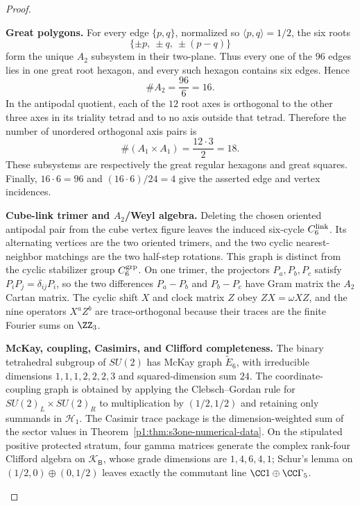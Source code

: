 \documentclass[11pt]{article}
\begin{document}
\begin{proof}
\begin{proofsteps}[label=\textbf{(\roman*)}]
\item \textbf{Great polygons.}
For every edge \(\{p,q\}\), normalized so
\(\langle p,q\rangle=1/2\), the six roots
\[
    \{\pm p,\ \pm q,\ \pm(p-q)\}
\]
form the unique \(A_2\) subsystem in their two-plane.  Thus every one of the
\(96\) edges lies in one great root hexagon, and every such hexagon contains
six edges.  Hence
\[
    \#A_2=\frac{96}{6}=16.
\]
In the antipodal quotient, each of the \(12\) root axes is orthogonal to the
other three axes in its triality tetrad and to no axis outside that tetrad.
Therefore the number of unordered orthogonal axis pairs is
\[
    \#(A_1\times A_1)=\frac{12\cdot3}{2}=18.
\]
These subsystems are respectively the great regular hexagons and great
squares.  Finally, \(16\cdot6=96\) and
\((16\cdot6)/24=4\) give the asserted edge and vertex incidences.

\item \textbf{Cube-link trimer and \(A_2\)/Weyl algebra.}
Deleting the chosen oriented antipodal pair from the cube vertex figure leaves
the induced six-cycle \(C_6^{\rm link}\).  Its alternating vertices are the
two oriented trimers, and the two cyclic nearest-neighbor matchings are the
two half-step rotations.  This graph is distinct from the cyclic stabilizer
group \(C_6^{\rm grp}\).  On one trimer, the projectors \(P_a,P_b,P_c\)
satisfy \(P_iP_j=\delta_{ij}P_i\), so the two differences \(P_a-P_b\) and
\(P_b-P_c\) have Gram matrix the \(A_2\) Cartan matrix.  The cyclic shift
\(X\) and clock matrix \(Z\) obey \(ZX=\omega XZ\), and the nine operators
\(X^aZ^b\) are trace-orthogonal because their traces are the finite Fourier
sums on \(\ZZ_3\).

\item \textbf{McKay, coupling, Casimirs, and Clifford completeness.}
The binary tetrahedral subgroup of \(SU(2)\) has McKay graph \(\widetilde E_6\), with irreducible dimensions \(1,1,1,2,2,2,3\) and squared-dimension sum \(24\).  The coordinate-coupling graph is obtained by applying the Clebsch--Gordan rule for \(SU(2)_L\times SU(2)_R\) to multiplication by \((1/2,1/2)\) and retaining only summands in \(\mathcal H_1\).  The Casimir trace package is the dimension-weighted sum of the sector values in Theorem~\ref{p1:thm:s3one-numerical-data}.  On the stipulated positive protected stratum, four gamma matrices generate the complex rank-four Clifford algebra on \(\mathcal K_{\mathsf B}\), whose grade dimensions are \(1,4,6,4,1\); Schur's lemma on \((1/2,0)\oplus(0,1/2)\) leaves exactly the commutant line \(\CC1\oplus\CC\Gamma_5\).
\end{proofsteps}
\end{proof}
\end{document}
